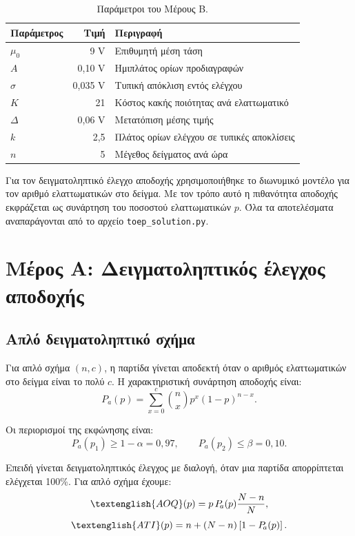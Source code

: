 \documentclass[12pt,a4paper]{article}
\newcommand{\code}[1]{\texttt{\textenglish{#1}}}
\newcommand{\Pa}{P_{\!a}}
\newcommand{\AOQ}{\textenglish{AOQ}}
\newcommand{\ATI}{\textenglish{ATI}}
\begin{document}
\begin{table}[H]
\centering
\caption{Παράμετροι του Μέρους Β.}
\begin{tabular}{lrl}
\toprule
\textbf{Παράμετρος} & \textbf{Τιμή} & \textbf{Περιγραφή} \\
\midrule
\(\mu_0\) & 9 V & Επιθυμητή μέση τάση \\
\(A\) & 0,10 V & Ημιπλάτος ορίων προδιαγραφών \\
\(\sigma\) & 0,035 V & Τυπική απόκλιση εντός ελέγχου \\
\(K\) & 21 & Κόστος κακής ποιότητας ανά ελαττωματικό \\
\(\Delta\) & 0,06 V & Μετατόπιση μέσης τιμής \\
\(k\) & 2,5 & Πλάτος ορίων ελέγχου σε τυπικές αποκλίσεις \\
\(n\) & 5 & Μέγεθος δείγματος ανά ώρα \\
\bottomrule
\end{tabular}
\end{table}

Για τον δειγματοληπτικό έλεγχο αποδοχής χρησιμοποιήθηκε το διωνυμικό μοντέλο
για τον αριθμό ελαττωματικών στο δείγμα. Με τον τρόπο αυτό η πιθανότητα
αποδοχής εκφράζεται ως συνάρτηση του ποσοστού ελαττωματικών \(p\). Όλα τα
αποτελέσματα αναπαράγονται από το αρχείο \code{toep\_solution.py}.

\newpage

\section{Μέρος Α: Δειγματοληπτικός έλεγχος αποδοχής}

\subsection{Απλό δειγματοληπτικό σχήμα}

Για απλό σχήμα \((n,c)\), η παρτίδα γίνεται αποδεκτή όταν ο αριθμός
ελαττωματικών στο δείγμα είναι το πολύ \(c\). Η χαρακτηριστική συνάρτηση
αποδοχής είναι:
\[
    \Pa(p)=\sum_{x=0}^{c}\binom{n}{x}p^x(1-p)^{n-x}.
\]

Οι περιορισμοί της εκφώνησης είναι:
\[
    \Pa(p_1)\ge 1-\alpha = 0{,}97,
    \qquad
    \Pa(p_2)\le \beta = 0{,}10.
\]

Επειδή γίνεται δειγματοληπτικός έλεγχος με διαλογή, όταν μια παρτίδα
απορρίπτεται ελέγχεται 100\%. Για απλό σχήμα έχουμε:
\[
    \AOQ(p)=p\,\Pa(p)\frac{N-n}{N},
\]
\[
    \ATI(p)=n+(N-n)\left[1-\Pa(p)\right].
\]
\end{document}

